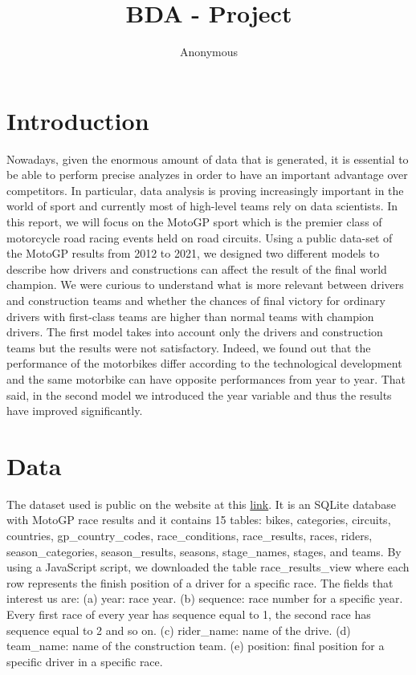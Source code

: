 \documentclass[
]{article}
\title{BDA - Project}
\author{Anonymous}
\date{}
\begin{document}
\maketitle

{
\hypersetup{linkcolor=}
\setcounter{tocdepth}{1}
\tableofcontents
}
\hypertarget{introduction}{%
\section{Introduction}\label{introduction}}

Nowadays, given the enormous amount of data that is generated, it is
essential to be able to perform precise analyzes in order to have an
important advantage over competitors. In particular, data analysis is
proving increasingly important in the world of sport and currently most
of high-level teams rely on data scientists. In this report, we will
focus on the MotoGP sport which is the premier class of motorcycle road
racing events held on road circuits. Using a public data-set of the
MotoGP results from 2012 to 2021, we designed two different models to
describe how drivers and constructions can affect the result of the
final world champion. We were curious to understand what is more
relevant between drivers and construction teams and whether the chances
of final victory for ordinary drivers with first-class teams are higher
than normal teams with champion drivers. The first model takes into
account only the drivers and construction teams but the results were not
satisfactory. Indeed, we found out that the performance of the
motorbikes differ according to the technological development and the
same motorbike can have opposite performances from year to year. That
said, in the second model we introduced the year variable and thus the
results have improved significantly.

\hypertarget{data}{%
\section{Data}\label{data}}

The dataset used is public on the website at this
\href{https://observablehq.com/@piratus/motogp-results-database}{link}.
It is an SQLite database with MotoGP race results and it contains 15
tables: bikes, categories, circuits, countries, gp\_country\_codes,
race\_conditions, race\_results, races, riders, season\_categories,
season\_results, seasons, stage\_names, stages, and teams. By using a
JavaScript script, we downloaded the table race\_results\_view where
each row represents the finish position of a driver for a specific race.
The fields that interest us are: (a) year: race year. (b) sequence: race
number for a specific year. Every first race of every year has sequence
equal to 1, the second race has sequence equal to 2 and so on. (c)
rider\_name: name of the drive. (d) team\_name: name of the construction
team. (e) position: final position for a specific driver in a specific
race.
\end{document}
